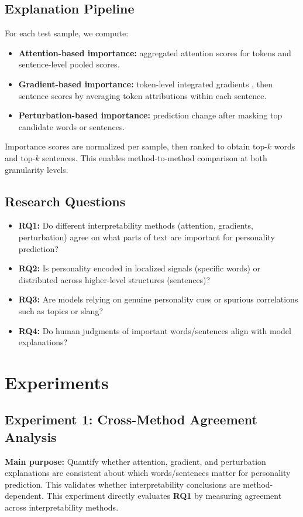 \documentclass[sigplan,screen]{acmart}
\begin{document}
\subsection{Explanation Pipeline}
For each test sample, we compute:
\begin{itemize}
    \item \textbf{Attention-based importance:} aggregated attention scores for tokens and sentence-level pooled scores.
    \item \textbf{Gradient-based importance:} token-level integrated gradients \cite{sundararajan2017axiomatic}, then sentence scores by averaging token attributions within each sentence.
    \item \textbf{Perturbation-based importance:} prediction change after masking top candidate words or sentences.
\end{itemize}

Importance scores are normalized per sample, then ranked to obtain top-$k$ words and top-$k$ sentences. This enables method-to-method comparison at both granularity levels.

\subsection{Research Questions}
\begin{itemize}
    \item \textbf{RQ1:} Do different interpretability methods (attention, gradients, perturbation) agree on what parts of text are important for personality prediction?
    \item \textbf{RQ2:} Is personality encoded in localized signals (specific words) or distributed across higher-level structures (sentences)?
    \item \textbf{RQ3:} Are models relying on genuine personality cues or spurious correlations such as topics or slang?
    \item \textbf{RQ4:} Do human judgments of important words/sentences align with model explanations?
\end{itemize}

\section{Experiments}
\subsection{Experiment 1: Cross-Method Agreement Analysis}
\textbf{Main purpose:} Quantify whether attention, gradient, and perturbation explanations are consistent about which words/sentences matter for personality prediction. This validates whether interpretability conclusions are method-dependent.
This experiment directly evaluates \textbf{RQ1} by measuring agreement across interpretability methods.
\end{document}
